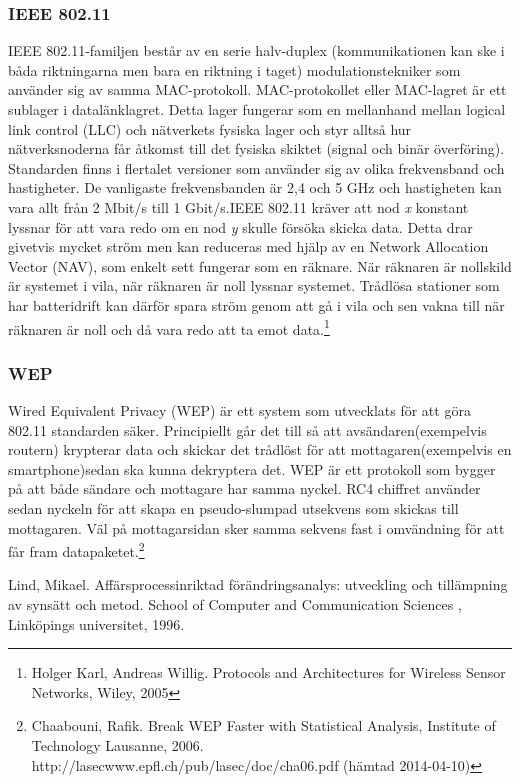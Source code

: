 \documentclass[a4paper,12pt,fleqn]{article}
\begin{document}
\subsubsection{IEEE 802.11}
IEEE 802.11-familjen består av en serie halv-duplex (kommunikationen kan ske i båda riktningarna men bara en riktning i taget) modulationstekniker som använder sig av samma MAC-protokoll. MAC-protokollet eller MAC-lagret är ett sublager i datalänklagret. Detta lager fungerar som en mellanhand mellan logical link control (LLC) och nätverkets fysiska lager och styr alltså hur nätverksnoderna får åtkomst till det fysiska skiktet (signal och binär överföring). 
\\
\newline
Standarden finns i flertalet versioner som använder sig av olika frekvensband och hastigheter. De vanligaste frekvensbanden är 2,4 och 5 GHz och hastigheten kan vara allt från 2 Mbit/s till 1 Gbit/s.IEEE 802.11 kräver att nod \emph{x} konstant lyssnar för att vara redo om en nod \emph{y} skulle försöka skicka data. Detta drar givetvis mycket ström men kan reduceras med hjälp av en Network Allocation Vector (NAV), som enkelt sett fungerar som en räknare. När räknaren är nollskild är systemet i vila, när räknaren är noll lyssnar systemet. Trådlösa stationer som har batteridrift kan därför spara ström genom att gå i vila och sen vakna till när räknaren är noll och då vara redo att ta emot data.\footnote{Holger Karl, Andreas Willig. Protocols and Architectures for Wireless Sensor Networks, Wiley, 2005}

\subsubsection{WEP}
Wired Equivalent Privacy (WEP) är ett system som utvecklats för att göra 802.11 standarden säker. Principiellt går det till så att avsändaren(exempelvis routern) krypterar data och skickar det trådlöst för att mottagaren(exempelvis en smartphone)sedan ska kunna dekryptera det. WEP är ett protokoll som bygger på att både sändare och mottagare har samma nyckel. RC4 chiffret använder sedan nyckeln för att skapa en pseudo-slumpad utsekvens som skickas till mottagaren. Väl på mottagarsidan sker samma sekvens fast i omvändning för att får fram datapaketet.\footnote{\label{RC4}Chaabouni, Rafik. Break WEP Faster with Statistical Analysis, Institute of Technology Lausanne, 2006. http://lasecwww.epfl.ch/pub/lasec/doc/cha06.pdf (hämtad 2014-04-10)}

Lind, Mikael. Affärsprocessinriktad förändringsanalys: utveckling och tillämpning av synsätt och metod. School of Computer and Communication Sciences
, Linköpings universitet, 1996.
\end{document}
